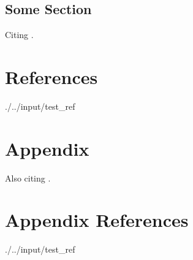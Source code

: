 \documentclass[12pt]{article}
\newcommand*{\dir}{.}
\renewcommand*{\dir}{./..}
\begin{document}
\begin{btUnit}
\begin{spacing}{1.32}
\section{Some Section}

Citing \cite{gentzkow2010drives}.

\end{spacing}

\section*{References}
\begin{btSect}[chicago]{\dir/input/test_ref}
\btPrintCited
\end{btSect}
\end{btUnit}

\appendix

\begin{btUnit}
\section*{Appendix}
Also citing \cite{gentzkow2011ideological}.

\section*{Appendix References}
\begin{btSect}[chicago]{\dir/input/test_ref}
\btPrintCited
\end{btSect}
\end{btUnit}
\end{document}
